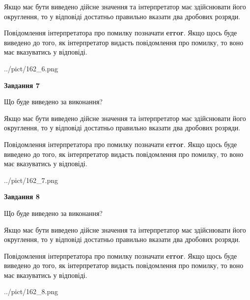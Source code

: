 \documentclass[12pt, ukrainian]{article}
\begin{document}
{\begin {Large}
Якщо має бути виведено дійсне значення та інтерпретатор має здійснювати його округлення, 
то у відповіді достатньо правильно вказати два дробових розряди.

Повідомлення інтерпретатора про помилку позначати \textbf{error}.
Якщо щось буде виведено до того, як інтерпретатор видасть повідомлення про помилку, 
то воно має вказуватись у відповіді. \par

\begin{center}
	{../pict/162_6.png}
\end{center}
\newpage

{\begin {center}\textbf{Завдання 7}\end {center}}\par
Що буде виведено за виконання? \par

Якщо має бути виведено дійсне значення та інтерпретатор має здійснювати його округлення, 
то у відповіді достатньо правильно вказати два дробових розряди.

Повідомлення інтерпретатора про помилку позначати \textbf{error}.
Якщо щось буде виведено до того, як інтерпретатор видасть повідомлення про помилку, 
то воно має вказуватись у відповіді. \par

\begin{center}
	{../pict/162_7.png}
\end{center}
\newpage

{\begin {center}\textbf{Завдання 8}\end {center}}\par
Що буде виведено за виконання? \par

Якщо має бути виведено дійсне значення та інтерпретатор має здійснювати його округлення, 
то у відповіді достатньо правильно вказати два дробових розряди.

Повідомлення інтерпретатора про помилку позначати \textbf{error}.
Якщо щось буде виведено до того, як інтерпретатор видасть повідомлення про помилку, 
то воно має вказуватись у відповіді. \par

\begin{center}
	{../pict/162_8.png}
\end{center}
\newpage


\end{Large}}
\end{document}
